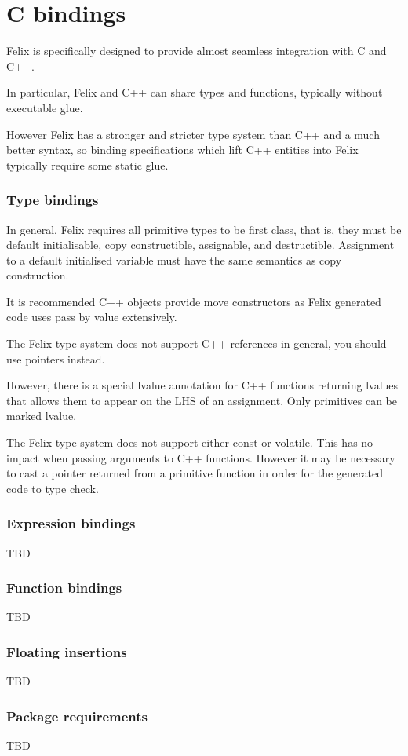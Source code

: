 \documentclass[oneside]{book}
\begin{document}
{\part{C bindings}
Felix is specifically designed to provide almost seamless integration
with C and C++.

In particular, Felix and C++ can share types and functions,
typically without executable glue.

However Felix has a stronger and stricter type system than C++
and a much better syntax, so binding specifications which lift
C++ entities into Felix typically require some static glue.

\section{Type bindings}
In general, Felix requires all primitive types to be first class,
that is, they must be default initialisable, copy constructible,
assignable, and destructible. Assignment to a default initialised
variable must have the same semantics as copy construction.

It is recommended C++ objects provide move constructors as
Felix generated code uses pass by value extensively.

The Felix type system does not support C++ references in general,
you should use pointers instead. 

However, there is a special lvalue annotation for C++ functions
returning lvalues that allows them to appear on the LHS of
an assignment. Only primitives can be marked lvalue.

The Felix type system does not support either const or volatile.
This has no impact when passing arguments to C++ functions.
However it may be necessary to cast a pointer returned from
a primitive function in order for the generated code to type check.



\section{Expression bindings}
TBD
\section{Function bindings}
TBD
\section{Floating insertions}
TBD
\section{Package requirements}
TBD

}
\end{document}
